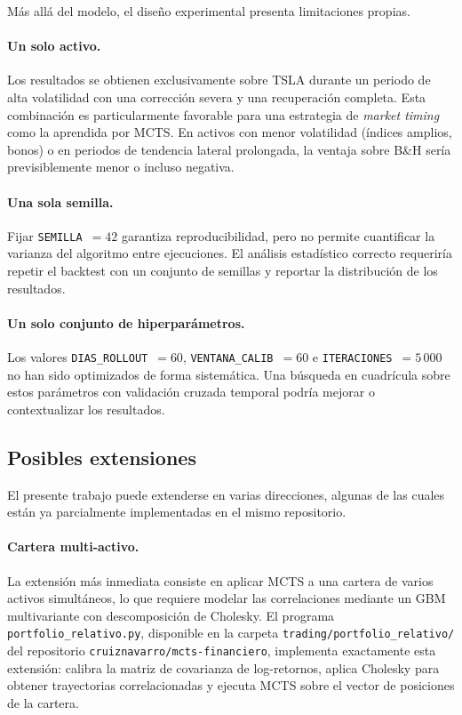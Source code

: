 Más allá del modelo, el diseño experimental presenta limitaciones propias.

\paragraph{Un solo activo.} Los resultados se obtienen exclusivamente sobre TSLA durante un periodo de alta volatilidad con una corrección severa y una recuperación completa. Esta combinación es particularmente favorable para una estrategia de \emph{market timing} como la aprendida por MCTS. En activos con menor volatilidad (índices amplios, bonos) o en periodos de tendencia lateral prolongada, la ventaja sobre B\&H sería previsiblemente menor o incluso negativa.

\paragraph{Una sola semilla.} Fijar \texttt{SEMILLA}~$= 42$ garantiza reproducibilidad, pero no permite cuantificar la varianza del algoritmo entre ejecuciones. El análisis estadístico correcto requeriría repetir el backtest con un conjunto de semillas y reportar la distribución de los resultados.

\paragraph{Un solo conjunto de hiperparámetros.} Los valores \texttt{DIAS\_ROLLOUT}~$= 60$, \texttt{VENTANA\_CALIB}~$= 60$ e \texttt{ITERACIONES}~$= 5\,000$ no han sido optimizados de forma sistemática. Una búsqueda en cuadrícula sobre estos parámetros con validación cruzada temporal podría mejorar o contextualizar los resultados.

\subsection{Posibles extensiones}
\label{subsec:extensiones}

El presente trabajo puede extenderse en varias direcciones, algunas de las cuales están ya parcialmente implementadas en el mismo repositorio.

\paragraph{Cartera multi-activo.} La extensión más inmediata consiste en aplicar MCTS a una cartera de varios activos simultáneos, lo que requiere modelar las correlaciones mediante un GBM multivariante con descomposición de Cholesky. El programa \texttt{portfolio\_relativo.py}, disponible en la carpeta \texttt{trading/portfolio\_relativo/} del repositorio \texttt{cruiznavarro/mcts-financiero}, implementa exactamente esta extensión: calibra la matriz de covarianza de log-retornos, aplica Cholesky para obtener trayectorias correlacionadas y ejecuta MCTS sobre el vector de posiciones de la cartera.

